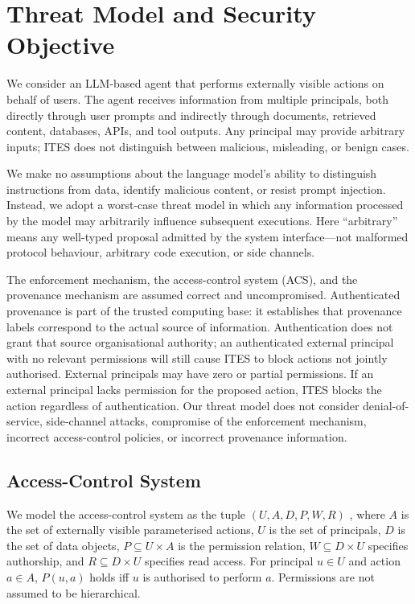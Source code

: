 \documentclass{article}
\begin{document}
\section{Threat Model and Security Objective}
\label{sec:threat-model}

We consider an LLM-based agent that performs externally visible actions on
behalf of users. The agent receives information from multiple principals, both
directly through user prompts and indirectly through documents, retrieved
content, databases, APIs, and tool outputs. Any principal may provide arbitrary
inputs; ITES does not distinguish between malicious, misleading, or benign
cases.

We make no assumptions about the language model's ability to distinguish
instructions from data, identify malicious content, or resist prompt injection.
Instead, we adopt a worst-case threat model in which any information processed
by the model may arbitrarily influence subsequent executions. Here
``arbitrary'' means any well-typed proposal admitted by the system
interface---not malformed protocol behaviour, arbitrary code execution, or side
channels.

The enforcement mechanism, the access-control system (ACS), and the provenance
mechanism are assumed correct and uncompromised. Authenticated provenance is
part of the trusted computing base: it establishes that provenance labels
correspond to the actual source of information. Authentication does not grant
that source organisational authority; an authenticated external principal
with no relevant permissions will still cause ITES to block actions not
jointly authorised. External principals may have zero or partial permissions.
If an external principal lacks permission for the proposed action, ITES blocks
the action regardless of authentication. Our threat model does not
consider denial-of-service, side-channel attacks, compromise of the enforcement
mechanism, incorrect access-control policies, or incorrect provenance
information.

\subsection{Access-Control System}

We model the access-control system as the tuple $(U, A, D, P, W, R)$
\citep{servos2017abac}, where $A$ is the set of externally visible
parameterised actions, $U$ is the set of principals, $D$ is the set of data
objects, $P \subseteq U \times A$ is the permission relation, $W \subseteq
D \times U$ specifies authorship, and $R \subseteq D \times U$ specifies read
access. For principal $u \in U$ and action $a \in A$, $P(u,a)$ holds iff $u$ is
authorised to perform $a$. Permissions are not assumed to be hierarchical.
\end{document}
